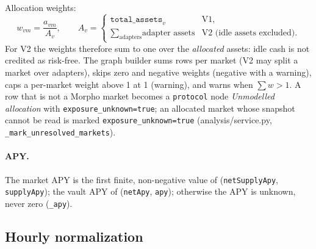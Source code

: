 \documentclass[11pt,a4paper]{article}
\newcommand{\code}[1]{\texttt{#1}}
\newcommand{\src}[1]{\textsf{\small #1}}
\begin{document}
Allocation weights:
\begin{equation}
w_{v m}=\frac{a_{v m}}{A_v},\qquad
A_v=\begin{cases}\code{total\_assets}_v & \text{V1},\\
\sum_{\text{adapters}} \text{adapter assets} & \text{V2 (idle assets excluded).}\end{cases}
\end{equation}
For V2 the weights therefore sum to one over the \emph{allocated} assets: idle
cash is not credited as risk-free. The graph builder sums rows per market (V2 may
split a market over adapters), skips zero and negative weights (negative with a
warning), caps a per-market weight above 1 at 1 (warning), and warns when
$\sum w>1$. A row that is not a Morpho market becomes a \code{protocol} node
\emph{Unmodelled allocation} with \code{exposure\_unknown=true}; an allocated
market whose snapshot cannot be read is marked \code{exposure\_unknown=true}
(\src{analysis/service.py}, \code{\_mark\_unresolved\_markets}).

\paragraph{APY.} The market APY is the first finite, non-negative value of
(\code{netSupplyApy}, \code{supplyApy}); the vault APY of (\code{netApy},
\code{apy}); otherwise the APY is unknown, never zero (\code{\_apy}).

\subsection{Hourly normalization}\label{sec:hourly}
\end{document}
